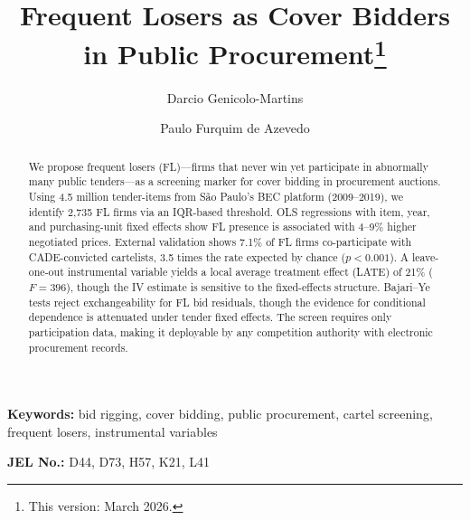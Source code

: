 \begin{frontmatter}

\title{Frequent Losers as Cover Bidders in Public Procurement\texorpdfstring{\footnote{This version: March 2026.}}{}}

\author[insper]{Darcio Genicolo-Martins}
\author[insper]{Paulo Furquim de Azevedo}

\begin{abstract}
We propose frequent losers (FL)---firms that never win yet participate in %
abnormally many public tenders---as a screening marker for cover bidding
in procurement auctions. Using 4.5 million tender-items from S\~ao
Paulo's BEC platform (2009--2019), we identify 2,735 FL firms via an
IQR-based threshold. OLS regressions with item, year, and purchasing-unit
fixed effects show FL presence is associated with 4--9\% higher
negotiated prices. External validation shows 7.1\% of FL firms
co-participate with CADE-convicted cartelists, 3.5 times the rate
expected by chance ($p < 0.001$). A leave-one-out instrumental variable
yields a local average treatment effect (LATE) of 21\% ($F = 396$),
though the IV estimate is sensitive to the fixed-effects structure.
Bajari--Ye tests reject exchangeability for FL bid residuals, though
the evidence for conditional dependence is attenuated under tender
fixed effects. The screen requires only participation data, making it
deployable by any competition authority with electronic procurement
records.
\end{abstract}

\end{frontmatter}

\noindent\textbf{Keywords:} bid rigging, cover bidding, public procurement, cartel screening, frequent losers, instrumental variables

\noindent\textbf{JEL No.:} D44, D73, H57, K21, L41

\bigskip
